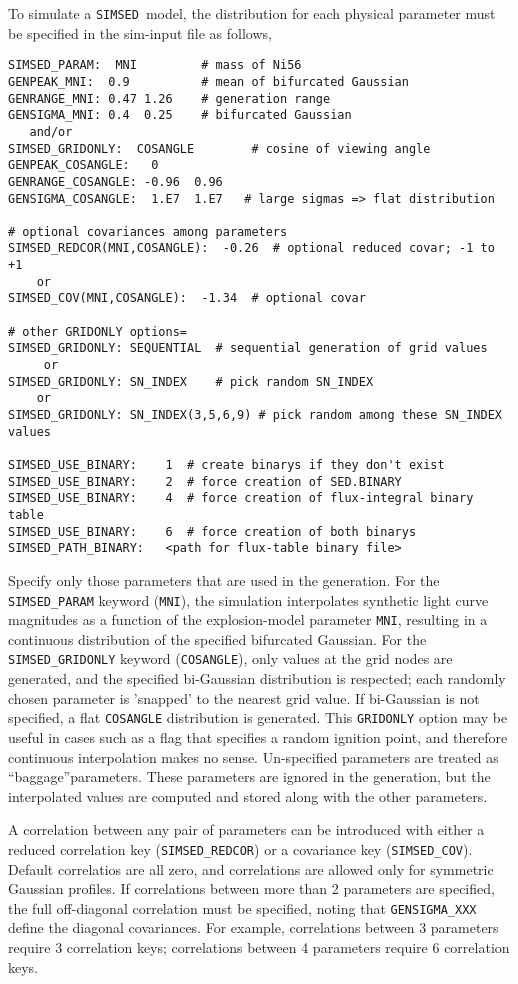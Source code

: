 \documentclass[12pt]{article}
\newcommand{\SIMSED}{{\tt SIMSED}}
\begin{document}
To simulate a \SIMSED\ model, the distribution for each
physical parameter must be specified in the sim-input file 
as follows,
%
\begin{Verbatim}[frame=single]
SIMSED_PARAM:  MNI         # mass of Ni56
GENPEAK_MNI:  0.9          # mean of bifurcated Gaussian
GENRANGE_MNI: 0.47 1.26    # generation range
GENSIGMA_MNI: 0.4  0.25    # bifurcated Gaussian
   and/or 
SIMSED_GRIDONLY:  COSANGLE        # cosine of viewing angle
GENPEAK_COSANGLE:   0
GENRANGE_COSANGLE: -0.96  0.96
GENSIGMA_COSANGLE:  1.E7  1.E7   # large sigmas => flat distribution

# optional covariances among parameters
SIMSED_REDCOR(MNI,COSANGLE):  -0.26  # optional reduced covar; -1 to +1
    or
SIMSED_COV(MNI,COSANGLE):  -1.34  # optional covar

# other GRIDONLY options=
SIMSED_GRIDONLY: SEQUENTIAL  # sequential generation of grid values
     or
SIMSED_GRIDONLY: SN_INDEX    # pick random SN_INDEX
    or
SIMSED_GRIDONLY: SN_INDEX(3,5,6,9) # pick random among these SN_INDEX values

SIMSED_USE_BINARY:    1  # create binarys if they don't exist
SIMSED_USE_BINARY:    2  # force creation of SED.BINARY
SIMSED_USE_BINARY:    4  # force creation of flux-integral binary table
SIMSED_USE_BINARY:    6  # force creation of both binarys
SIMSED_PATH_BINARY:   <path for flux-table binary file>
\end{Verbatim}
%
Specify only those parameters that are used in the generation.
For the {\tt SIMSED\_PARAM} keyword ({\tt MNI}), the simulation 
interpolates synthetic light curve magnitudes as a function of
the explosion-model parameter {\tt MNI}, resulting in a continuous
distribution of the specified bifurcated Gaussian.
For the {\tt SIMSED\_GRIDONLY} keyword ({\tt COSANGLE}), 
only values at the grid nodes are generated,
and the specified bi-Gaussian distribution is respected;
each randomly chosen parameter is 'snapped' to 
the nearest grid value. If bi-Gaussian is not specified,
a flat {\tt COSANGLE} distribution is generated.
This {\tt GRIDONLY} option may be useful in cases such as a
flag that specifies a random ignition point, 
and therefore continuous interpolation makes no sense. 
Un-specified parameters are treated as ``baggage''parameters. 
These parameters are ignored in the generation, but the 
interpolated values are computed and stored along
with the other parameters.

A correlation between any pair of parameters can be introduced
with either a reduced correlation key ({\tt SIMSED\_REDCOR}) or a
covariance key ({\tt SIMSED\_COV}). 
Default correlatios are all zero, and correlations are allowed 
only for symmetric Gaussian profiles.
If correlations between more than 2 parameters are specified,
the full off-diagonal correlation must be specified, noting
that {\tt GENSIGMA\_XXX} define the diagonal covariances.
For example, correlations between 3 parameters require 
3 correlation keys; correlations between 4 parameters
require 6 correlation keys.
\end{document}
